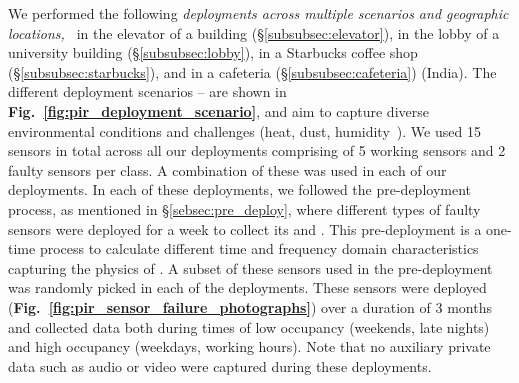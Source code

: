 We performed the following \emph{deployments across multiple scenarios and geographic locations,~\viz}  
\ca in the elevator of a building (\S\ref{subsubsec:elevator}), 
\cb in the lobby of a university building (\S\ref{subsubsec:lobby}), \cc in a Starbucks coffee shop (\S\ref{subsubsec:starbucks}), and \cd in a cafeteria (\S\ref{subsubsec:cafeteria}) (India).
The different deployment scenarios \ca -- \cc are shown in {\bfseries Fig.~\ref{fig:pir_deployment_scenario}}, and aim to capture diverse environmental conditions and challenges (heat, dust, humidity~\etc). 
We used 15 sensors in total across all our deployments comprising of 5 working sensors and 2 faulty sensors per class. A combination of these was used in each of our deployments. In each of these deployments, we followed the pre-deployment process, as mentioned in \S\ref{sebsec:pre_deploy}, where different types of faulty sensors were deployed for a week to collect its \aout and \cout. This pre-deployment is a one-time process to calculate different time and frequency domain characteristics capturing the physics of \aout. A subset of these sensors used in the pre-deployment was randomly picked in each of the deployments.
These sensors were deployed (\textbf{Fig.~\ref{fig:pir_sensor_failure_photographs}}) %
over a duration of 3 months and collected data both during times of low occupancy (weekends, late nights) and high occupancy (weekdays, working hours). Note that no auxiliary private data such as audio or video were captured during these deployments. 

